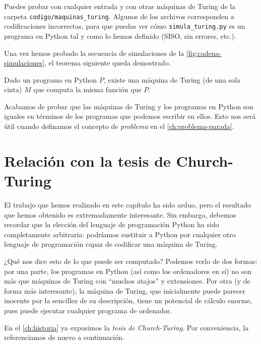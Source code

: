 Puedes probar con cualquier entrada y con otras máquinas de Turing de la carpeta \linebreak\texttt{codigo/maquinas\_turing}. Algunos de los archivos corresponden a codificaciones incorrectas, para que puedas ver cómo \texttt{simula\_turing.py} es un programa en Python tal y como lo hemos definido (SISO, sin errores, etc.).

Una vez hemos probado la secuencia de simulaciones de la \cref{fig:cadena-simulaciones}, el teorema siguiente queda demostrado.

\begin{teorema}\label{teo:equivalencia}
Dado un programa en Python $P$, existe una máquina de Turing (de una sola cinta) $M$ que computa la misma función que $P$.
\end{teorema}

Acabamos de probar que las máquinas de Turing y los programas en Python son iguales en términos de los programas que podemos escribir en ellos. Esto nos será útil cuando definamos el concepto de \emph{problema} en el \cref{ch:problema-parada}.

\section{Relación con la tesis de Church-Turing}\label{sec:church-turing}

El trabajo que hemos realizado en este capítulo ha sido arduo, pero el resultado que hemos obtenido es extremadamente interesante. Sin embargo, debemos recordar que la elección del lenguaje de programación Python ha sido completamente arbitraria: podríamos sustituir a Python por cualquier otro lenguaje de programación capaz de codificar una máquina de Turing.

¿Qué nos dice esto de lo que puede ser computado? Podemos verlo de dos formas: por una parte, los programas en Python (así como los ordenadores en sí) no son más que máquinas de Turing con ``muchos atajos'' y extensiones. Por otra (y de forma más interesante), la máquina de Turing, que inicialmente puede parecer inocente por la sencillez de su descripción, tiene un potencial de cálculo enorme, pues puede ejecutar cualquier programa de ordenador.

En el \cref{ch:historia} ya expusimos la \emph{tesis de Church-Turing}. Por conveniencia, la referenciamos de nuevo a continuación.

